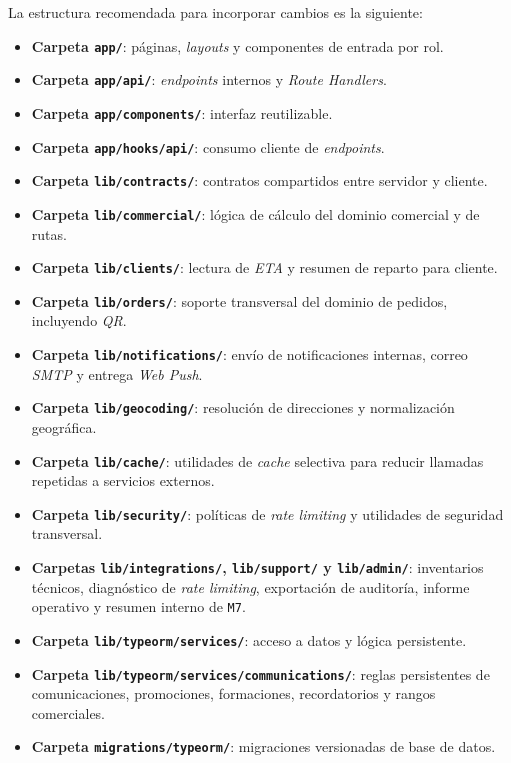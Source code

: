 La estructura recomendada para incorporar cambios es la siguiente:

\begin{itemize}
    \item \textbf{Carpeta \texttt{app/}}: páginas, \textit{layouts} y componentes de entrada por rol.
    \item \textbf{Carpeta \texttt{app/api/}}: \textit{endpoints} internos y \textit{Route Handlers}.
    \item \textbf{Carpeta \texttt{app/components/}}: interfaz reutilizable.
    \item \textbf{Carpeta \texttt{app/hooks/api/}}: consumo cliente de \textit{endpoints}.
    \item \textbf{Carpeta \texttt{lib/contracts/}}: contratos compartidos entre servidor y cliente.
    \item \textbf{Carpeta \texttt{lib/commercial/}}: lógica de cálculo del dominio comercial y de rutas.
    \item \textbf{Carpeta \texttt{lib/clients/}}: lectura de \textit{ETA} y resumen de reparto para cliente.
    \item \textbf{Carpeta \texttt{lib/orders/}}: soporte transversal del dominio de pedidos, incluyendo \textit{QR}.
    \item \textbf{Carpeta \texttt{lib/notifications/}}: envío de notificaciones internas, correo \textit{SMTP} y entrega \textit{Web Push}.
    \item \textbf{Carpeta \texttt{lib/geocoding/}}: resolución de direcciones y normalización geográfica.
    \item \textbf{Carpeta \texttt{lib/cache/}}: utilidades de \textit{cache} selectiva para reducir llamadas repetidas a servicios externos.
    \item \textbf{Carpeta \texttt{lib/security/}}: políticas de \textit{rate limiting} y utilidades de seguridad transversal.
    \item \textbf{Carpetas \texttt{lib/integrations/}, \texttt{lib/support/} y \texttt{lib/admin/}}: inventarios técnicos, diagnóstico de \textit{rate limiting}, exportación de auditoría, informe operativo y resumen interno de \texttt{M7}.
    \item \textbf{Carpeta \texttt{lib/typeorm/services/}}: acceso a datos y lógica persistente.
    \item \textbf{Carpeta \texttt{lib/typeorm/services/communications/}}: reglas persistentes de comunicaciones, promociones, formaciones, recordatorios y rangos comerciales.
    \item \textbf{Carpeta \texttt{migrations/typeorm/}}: migraciones versionadas de base de datos.
\end{itemize}

